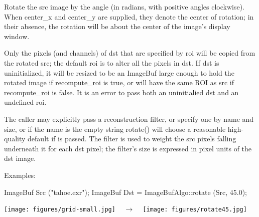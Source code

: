 Rotate the {\cf src} image by the {\cf angle} (in radians, with positive
angles clockwise). When {\cf center_x} and {\cf center_y} are supplied, they
denote the center of rotation; in their absence, the rotation will be about
the center of the image's display window.

Only the pixels (and channels) of {\cf dst} that are specified by {\cf roi}
will be copied from the rotated {\cf src}; the default {\cf roi} is to alter
all the pixels in {\cf dst}. If {\cf dst} is uninitialized, it will be
resized to be an ImageBuf large enough to hold the rotated image  if
{\cf recompute_roi} is {\cf true}, or will have the same ROI as {\cf src}
if {\cf recompute_roi} is false. It is an
error to pass both an uninitialied {\cf dst} and an undefined {\cf roi}.

The caller may explicitly pass a reconstruction filter, or specify one by
name and size, or if the name is the empty string {\cf rotate()} will choose
a reasonable high-quality default if \NULL is passed.  The filter is used to
weight the {\cf src} pixels falling underneath it for each {\cf dst} pixel;
the filter's size is expressed in pixel units of the {\cf dst} image.

\smallskip
\noindent Examples:
\begin{code}
    ImageBuf Src ("tahoe.exr");
    ImageBuf Dst = ImageBufAlgo::rotate (Src, 45.0);
\end{code}
\spc \texttt{[image: figures/grid-small.jpg]} 
~ {\Huge $\rightarrow$} ~
\texttt{[image: figures/rotate45.jpg]} \\
\apiend


